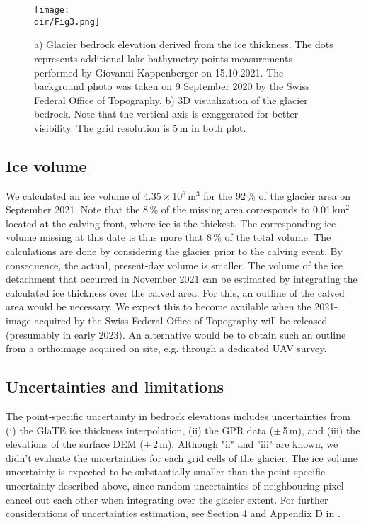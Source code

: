 \begin{figure}[h!]
\centering
\texttt{[image: \\dir/Fig3.png]}
\caption{a) Glacier bedrock elevation derived from the ice thickness. The dots represents additional lake bathymetry points-measurements performed by Giovanni Kappenberger on 15.10.2021. The background photo was taken on 9 September 2020 by the Swiss Federal Office of Topography. b) 3D visualization of the glacier bedrock. Note that the vertical axis is exaggerated for better visibility. The grid resolution is 5\,m in both plot.}
\label{fig:fig3}
\end{figure}

\subsection{Ice volume}

We calculated an ice volume of 4.35\,$\times$\,10$^6$\,m$^3$ for the 92\,\% of the glacier area on September 2021. Note that the 8\,\% of the missing area corresponds to 0.01\,km$^2$ located at the calving front, where ice is the thickest. The corresponding ice volume missing at this date is thus more that 8\,\% of the total volume. The calculations are done by considering the glacier prior to the calving event. By consequence, the actual, present-day volume is smaller. The volume of the ice detachment that occurred in November 2021 can be estimated by integrating the calculated ice thickness over the calved area. For this, an outline of the calved area would be necessary. We expect this to become available when the 2021-image acquired by the Swiss Federal Office of Topography will be released (presumably in early 2023). An alternative would be to obtain such an outline from a orthoimage acquired on site, e.g. through a dedicated UAV survey.  

\subsection{Uncertainties and limitations}

The point-specific uncertainty in bedrock elevations includes uncertainties from (i) the GlaTE ice thickness interpolation, (ii) the GPR data ($\pm$\,5\,m), and (iii) the elevations of the surface DEM ($\pm$\,2\,m). Although "ii" and "iii" are known, we didn't evaluate the uncertainties for each grid cells of the glacier. The ice volume uncertainty is expected to be substantially smaller than the point-specific uncertainty described above, since random uncertainties of neighbouring pixel cancel out each other when integrating over the glacier extent. For further considerations of uncertainties estimation, see Section 4 and Appendix D in \cite{Grab&al2021}.

